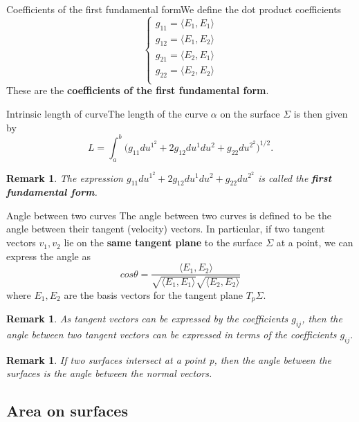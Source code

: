 \documentclass[twoside]{article}
\newtheorem{remark}[theorem]{Remark}
\begin{document}
\begin{definition_exam}{Coefficients of the first fundamental form}{}We define the dot product coefficients 
$$
\begin{cases}
g_{11} = \langle E_1,E_1\rangle\\
g_{12} = \langle E_1,E_2\rangle\\
g_{21} = \langle E_2,E_1\rangle\\
g_{22} = \langle E_2,E_2\rangle\\
\end{cases}
$$
These are the \textbf{coefficients of the first fundamental form}.
\end{definition_exam}

\begin{proposition_exam}{Intrinsic length of curve}{}The length of the curve $\alpha$ on the surface $\Sigma$ is then given by 
$$
L = \int_a^b \bigg(g_{11}du^{1^2} + 2g_{12}du^{1}du^{2} + g_{22}du^{2^2}  \bigg)^{1/2}.
$$
\end{proposition_exam}

\begin{remark}The expression $g_{11}du^{1^2} + 2g_{12}du^{1}du^{2} + g_{22}du^{2^2}$ is called the \textbf{first fundamental form}.
\end{remark}

\begin{definition_exam}{Angle between two curves}{} The angle between two curves is defined to be the angle between their tangent (velocity) vectors. In particular, if two tangent vectors $v_1, v_2$ lie on the \textbf{same tangent plane} to the surface $\Sigma$ at a point, we can express the angle as 
$$
cos \theta = \frac{\langle E_1, E_2 \rangle}{\sqrt{\langle E_1, E_1 \rangle}\sqrt{\langle E_2, E_2 \rangle}}
$$
where $E_1, E_2$ are the basis vectors for the tangent plane $T_p\Sigma.$
\end{definition_exam}
\begin{remark}As tangent vectors can be expressed by the coefficients $g_{ij}$, then the angle between two tangent vectors can be expressed in terms of the coefficients $g_{ij}.$
\end{remark}


\begin{remark}If two surfaces intersect at a point p, then the angle between the surfaces is the angle between the normal vectors.
\end{remark}
\subsection{Area on surfaces}
\end{document}
